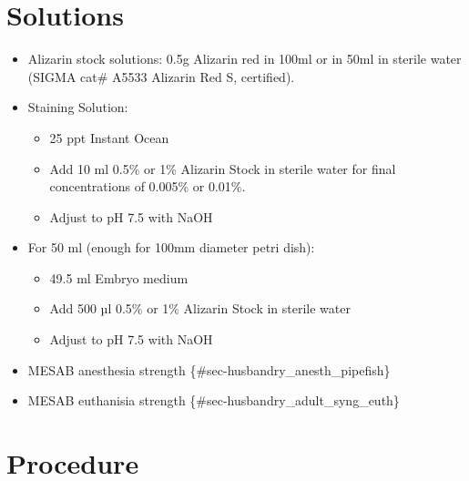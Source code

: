 \documentclass[
  letterpaper,
  DIV=11,
  numbers=noendperiod]{scrreprt}
\providecommand{\tightlist}{%
  \setlength{\itemsep}{0pt}\setlength{\parskip}{0pt}}\usepackage{longtable,booktabs,array}
\begin{document}
\hypertarget{solutions-73}{%
\section{Solutions}\label{solutions-73}}

\begin{itemize}
\tightlist
\item
  Alizarin stock solutions: 0.5g Alizarin red in 100ml or in 50ml in
  sterile water (SIGMA cat\# A5533 Alizarin Red S, certified).
\item
  Staining Solution:

  \begin{itemize}
  \tightlist
  \item
    25 ppt Instant Ocean
  \item
    Add 10 ml 0.5\% or 1\% Alizarin Stock in sterile water for final
    concentrations of 0.005\% or 0.01\%.
  \item
    Adjust to pH 7.5 with NaOH
  \end{itemize}
\item
  For 50 ml (enough for 100mm diameter petri dish):

  \begin{itemize}
  \tightlist
  \item
    49.5 ml Embryo medium
  \item
    Add 500 µl 0.5\% or 1\% Alizarin Stock in sterile water
  \item
    Adjust to pH 7.5 with NaOH
  \end{itemize}
\item
  MESAB anesthesia strength \{\#sec-husbandry\_anesth\_pipefish\}
\item
  MESAB euthanisia strength \{\#sec-husbandry\_adult\_syng\_euth\}
\end{itemize}

\hypertarget{procedure-81}{%
\section{Procedure}\label{procedure-81}}
\end{document}
